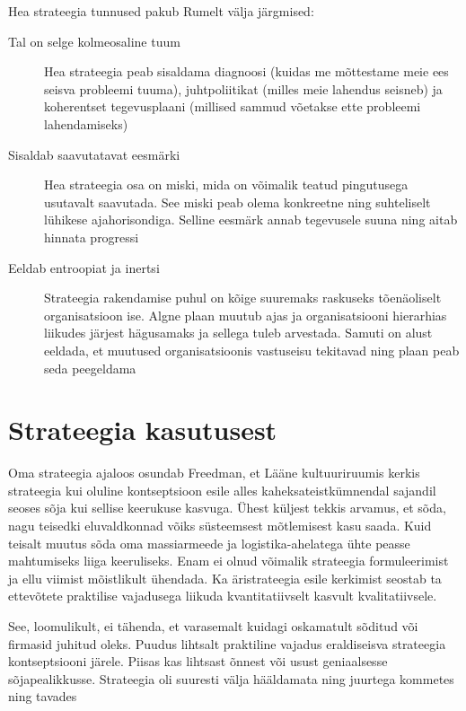 \documentclass{tufte-book}
\begin{document}
Hea strateegia tunnused pakub Rumelt välja järgmised:
\begin{description}
	\item[Tal on selge kolmeosaline tuum] Hea strateegia peab sisaldama diagnoosi (kuidas me mõttestame meie ees seisva probleemi tuuma), juhtpoliitikat (milles meie lahendus seisneb) ja koherentset tegevusplaani (millised sammud võetakse ette probleemi lahendamiseks)
	\item[Sisaldab saavutatavat eesmärki] Hea strateegia osa on miski, mida on võimalik teatud pingutusega usutavalt saavutada. See miski peab olema konkreetne ning suhteliselt lühikese ajahorisondiga. Selline eesmärk annab tegevusele suuna ning aitab hinnata progressi
	\item[Eeldab entroopiat ja inertsi] Strateegia rakendamise puhul on kõige suuremaks raskuseks tõenäoliselt organisatsioon ise. Algne plaan muutub ajas ja organisatsiooni hierarhias liikudes järjest hägusamaks ja sellega tuleb arvestada. Samuti on alust eeldada, et muutused organisatsioonis vastuseisu tekitavad ning plaan peab seda peegeldama
\end{description}

\section{Strateegia kasutusest}
\label{sec:strateegia:kasutu}
Oma strateegia ajaloos osundab Freedman, et Lääne kultuuriruumis kerkis strateegia kui oluline kontseptsioon esile alles kaheksateistkümnendal sajandil seoses sõja kui sellise keerukuse kasvuga\cite{freedman2013strategy}. Ühest küljest tekkis arvamus, et sõda, nagu teisedki eluvaldkonnad võiks süsteemsest mõtlemisest kasu saada. Kuid teisalt muutus sõda oma massiarmeede ja logistika-ahelatega ühte peasse mahtumiseks liiga keeruliseks. Enam ei olnud võimalik strateegia formuleerimist ja ellu viimist mõistlikult ühendada. Ka äristrateegia esile kerkimist seostab ta ettevõtete praktilise vajadusega liikuda kvantitatiivselt kasvult kvalitatiivsele.

See, loomulikult, ei tähenda, et varasemalt kuidagi oskamatult sõditud või firmasid juhitud oleks. Puudus lihtsalt praktiline vajadus eraldiseisva strateegia kontseptsiooni järele. Piisas kas lihtsast õnnest või usust geniaalsesse sõjapealikkusse. Strateegia oli suuresti välja hääldamata ning juurtega kommetes ning tavades
\end{document}
